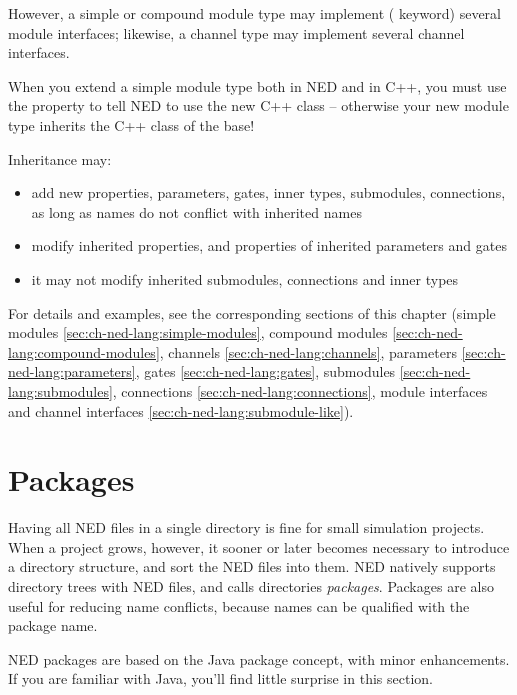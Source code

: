 However, a simple or compound module type may implement (
keyword) several module interfaces; likewise, a channel type may implement
several channel interfaces.

\begin{important}
    When you extend a simple module type both in NED and in C++, you must
    use the  property to tell NED to use the new C++ class --
    otherwise your new module type inherits the C++ class of the base!
\end{important}

Inheritance may:
\begin{itemize}
    \item add new properties, parameters, gates, inner types, submodules,
          connections, as long as names do not conflict with inherited names
    \item modify inherited properties, and properties of inherited parameters and
          gates
    \item it may not modify inherited submodules, connections and inner types
\end{itemize}

For details and examples, see the corresponding sections of this chapter
(simple modules \ref{sec:ch-ned-lang:simple-modules},
compound modules \ref{sec:ch-ned-lang:compound-modules},
channels \ref{sec:ch-ned-lang:channels},
parameters \ref{sec:ch-ned-lang:parameters},
gates \ref{sec:ch-ned-lang:gates},
submodules \ref{sec:ch-ned-lang:submodules},
connections \ref{sec:ch-ned-lang:connections},
module interfaces and channel interfaces \ref{sec:ch-ned-lang:submodule-like}).



\section{Packages}
\label{sec:ch-ned-lang:packages}

Having all NED files in a single directory is fine for small simulation projects. 
When a project grows, however, it sooner or later becomes
necessary to introduce a directory structure, and sort the NED files into
them. NED natively supports directory trees with NED files, and calls
directories \textit{packages}. Packages are also useful for reducing
name conflicts, because names can be qualified with the package name.

\begin{note}
    NED packages are based on the Java package concept, with minor
    enhancements. If you are familiar with Java, you'll find little
    surprise in this section.
\end{note}

